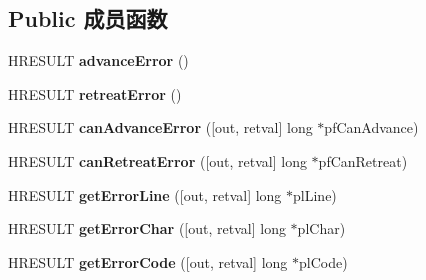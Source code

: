 \subsection*{Public 成员函数}
\begin{DoxyCompactItemize}
\item 
\mbox{\label{interface_s_h_doc_vw_1_1_i_script_error_list_a258e0da64aa90dd552210f8740785fa4}} 
H\+R\+E\+S\+U\+LT {\bfseries advance\+Error} ()
\item 
\mbox{\label{interface_s_h_doc_vw_1_1_i_script_error_list_a7ec47f078b2106eb8490afe5811d48d3}} 
H\+R\+E\+S\+U\+LT {\bfseries retreat\+Error} ()
\item 
\mbox{\label{interface_s_h_doc_vw_1_1_i_script_error_list_a6c7cbad313cd162a6ce93cbdd363e4d1}} 
H\+R\+E\+S\+U\+LT {\bfseries can\+Advance\+Error} (\mbox{[}out, retval\mbox{]} long $\ast$pf\+Can\+Advance)
\item 
\mbox{\label{interface_s_h_doc_vw_1_1_i_script_error_list_a8365c09846ef44dca6453f3bcc313f93}} 
H\+R\+E\+S\+U\+LT {\bfseries can\+Retreat\+Error} (\mbox{[}out, retval\mbox{]} long $\ast$pf\+Can\+Retreat)
\item 
\mbox{\label{interface_s_h_doc_vw_1_1_i_script_error_list_a7035c7288546c2878c1b77401d53cc82}} 
H\+R\+E\+S\+U\+LT {\bfseries get\+Error\+Line} (\mbox{[}out, retval\mbox{]} long $\ast$pl\+Line)
\item 
\mbox{\label{interface_s_h_doc_vw_1_1_i_script_error_list_ab3bfaa0a86a5b557f6bd16832a140cc0}} 
H\+R\+E\+S\+U\+LT {\bfseries get\+Error\+Char} (\mbox{[}out, retval\mbox{]} long $\ast$pl\+Char)
\item 
\mbox{\label{interface_s_h_doc_vw_1_1_i_script_error_list_a9bb08b2edf59ae1e75398161ee035219}} 
H\+R\+E\+S\+U\+LT {\bfseries get\+Error\+Code} (\mbox{[}out, retval\mbox{]} long $\ast$pl\+Code)
\item 
\mbox{\label{interface_s_h_doc_vw_1_1_i_script_error_list_aae389f3587c9f07e774821fc959da6f7}} 

\end{DoxyCompactItemize}
